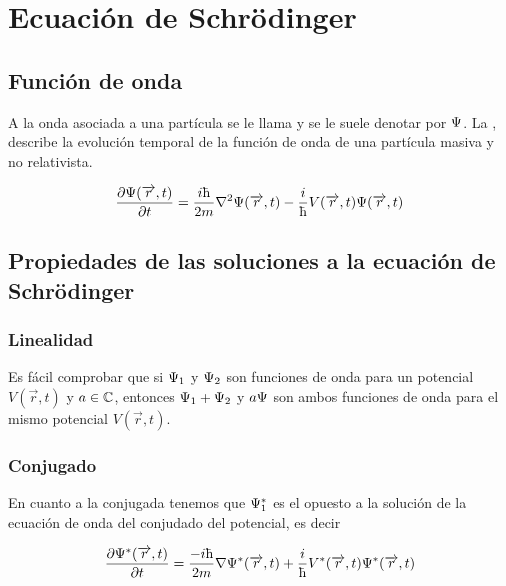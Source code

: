 \chapter{Ecuación de Schrödinger}\label{ch:ecuación-de-schrödinger}

\section{Función de onda}\label{sec:función-de-onda}
A la onda asociada a una partícula se le llama  y se le suele denotar por $\Psi$.
La , describe la evolución temporal de la función de onda de una partícula masiva y no relativista.
\begin{postulate}
    \begin{equation}
    \label{eq:ecuacion-schrodinger-no-relativista}
    \frac{\partial\fuconda(\vec{r},t)}{\partial t}=\frac{i\planckbarsymbol}{2m}\nabla^2\fuconda(\vec{r},t)-\frac{i}{\planckbarsymbol}V(\vec{r},t)\fuconda(\vec{r},t)
    \end{equation}
\end{postulate}

\section{Propiedades de las soluciones a la ecuación de Schrödinger}\label{sec:propiedades-de-las-soluciones-a-la-ecuación-de-schrödinger}

\subsection{Linealidad}\label{subsec:linealidad}
Es fácil comprobar que si $\Psi_1$ y $\Psi_2$ son funciones de onda para un potencial $V(\vec{r},t)$ y $a\in\mathbb{C}$, entonces $\Psi_1+\Psi_2$ y $a\Psi$ son ambos funciones de onda para el mismo potencial $V(\vec{r},t)$.

\subsection{Conjugado}\label{subsec:conjundado}
En cuanto a la conjugada tenemos que $\Psi^*_1$ es el opuesto a la solución de la ecuación de onda del conjudado del potencial, es decir

\begin{equation}
    \label{eq:ecuacion_schrodinger_conjugada}
    \frac{\partial\fuconda^*(\vec{r},t)}{\partial t}=\frac{-i\planckbarsymbol}{2m}\nabla\fuconda^*(\vec{r},t)+\frac{i}{\planckbarsymbol}V^*(\vec{r},t)\fuconda^*(\vec{r},t)
\end{equation}

